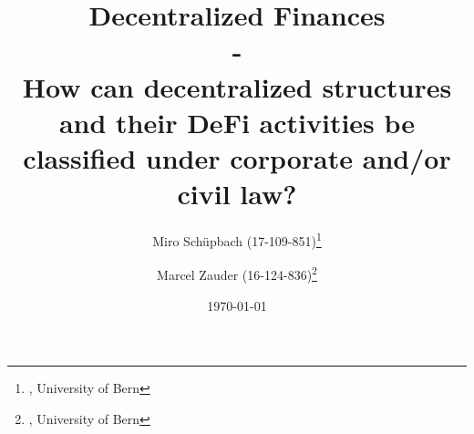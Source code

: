 \documentclass[a4paper,12pt]{report}
\begin{document}
	

	\title{Decentralized Finances \\ - \\ How can decentralized structures and their DeFi activities be classified under corporate and/or civil law?} %

	\author{Miro Schüpbach (17-109-851)\thanks{, University of Bern}
   		\and Marcel Zauder  (16-124-836)\thanks{, University of Bern}
   	}	%



	\date{\today} %

	\maketitle	
    
\end{document}
